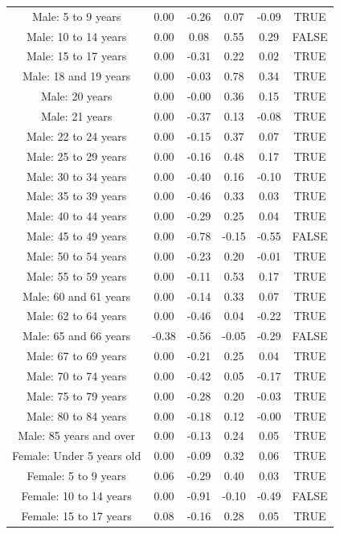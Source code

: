 \documentclass{article} %
\begin{document}
\begin{table}[H]
\begin{adjustbox}{width = \textwidth, height = \textheight}
\begin{tabular}{cccccc}
  Male: 5 to 9 years & 0.00 & -0.26 & 0.07 & -0.09 & TRUE \\ 
  Male: 10 to 14 years & 0.00 & 0.08 & 0.55 & 0.29 & FALSE \\ 
  Male: 15 to 17 years & 0.00 & -0.31 & 0.22 & 0.02 & TRUE \\ 
  Male: 18 and 19 years & 0.00 & -0.03 & 0.78 & 0.34 & TRUE \\ 
  Male: 20 years & 0.00 & -0.00 & 0.36 & 0.15 & TRUE \\ 
  Male: 21 years & 0.00 & -0.37 & 0.13 & -0.08 & TRUE \\ 
  Male: 22 to 24 years & 0.00 & -0.15 & 0.37 & 0.07 & TRUE \\ 
  Male: 25 to 29 years & 0.00 & -0.16 & 0.48 & 0.17 & TRUE \\ 
  Male: 30 to 34 years & 0.00 & -0.40 & 0.16 & -0.10 & TRUE \\ 
  Male: 35 to 39 years & 0.00 & -0.46 & 0.33 & 0.03 & TRUE \\ 
  Male: 40 to 44 years & 0.00 & -0.29 & 0.25 & 0.04 & TRUE \\ 
  Male: 45 to 49 years & 0.00 & -0.78 & -0.15 & -0.55 & FALSE \\ 
  Male: 50 to 54 years & 0.00 & -0.23 & 0.20 & -0.01 & TRUE \\ 
  Male: 55 to 59 years & 0.00 & -0.11 & 0.53 & 0.17 & TRUE \\ 
  Male: 60 and 61 years & 0.00 & -0.14 & 0.33 & 0.07 & TRUE \\ 
  Male: 62 to 64 years & 0.00 & -0.46 & 0.04 & -0.22 & TRUE \\ 
  Male: 65 and 66 years & -0.38 & -0.56 & -0.05 & -0.29 & FALSE \\ 
  Male: 67 to 69 years & 0.00 & -0.21 & 0.25 & 0.04 & TRUE \\ 
  Male: 70 to 74 years & 0.00 & -0.42 & 0.05 & -0.17 & TRUE \\ 
  Male: 75 to 79 years & 0.00 & -0.28 & 0.20 & -0.03 & TRUE \\ 
  Male: 80 to 84 years & 0.00 & -0.18 & 0.12 & -0.00 & TRUE \\ 
  Male: 85 years and over & 0.00 & -0.13 & 0.24 & 0.05 & TRUE \\ 
  Female: Under 5 years old & 0.00 & -0.09 & 0.32 & 0.06 & TRUE \\ 
  Female: 5 to 9 years & 0.06 & -0.29 & 0.40 & 0.03 & TRUE \\ 
  Female: 10 to 14 years & 0.00 & -0.91 & -0.10 & -0.49 & FALSE \\ 
  Female: 15 to 17 years & 0.08 & -0.16 & 0.28 & 0.05 & TRUE \\ 

\end{tabular}
\end{adjustbox}
\end{table}
\end{document}
